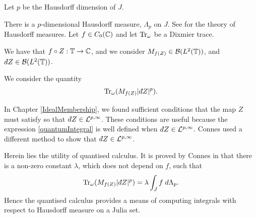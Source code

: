 Let $p$ be the Hausdorff dimension of $J$.

There is a $p$-dimensional Hausdorff measure, $\Lambda_p$ on $J$. See \cite{rogers1998hausdorff} for the theory
of Hausdorff measures.
Let
$f\in C_0(\mathbb{C})$ and let $\operatorname{Tr}_\omega$
be a Dixmier trace. 

We have that $f\circ Z :\mathbb{T}\to \mathbb{C}$, and we consider $M_{f(Z)} \in \mathcal{B}(L^2(\mathbb{T}))$,
and $\qd Z \in \mathcal{B}(L^2(\Circ))$.

We consider the quantity
\begin{equation}
    \label{quantumIntegral}
    \Tr_\omega(M_{f(Z)}|\qd Z|^p).
\end{equation}

\begin{remark}
    In Chapter \ref{IdealMembership}, we found sufficient conditions that the map
    $Z$ must satisfy so that $\qd Z \in \mathcal{L}^{p,\infty}$. These conditions
    are useful because the expression \ref{quantumIntegral} is well defined
    when $\qd Z \in \mathcal{L}^{p,\infty}$. Connes \cite[Ch. 4, Prop. 7]{Connes94} used
    a different method to show that $\qd Z \in \mathcal{L}^{p,\infty}$.
\end{remark}

Herein lies the utility
of quantised calculus.
It is proved by Connes in \cite[Ch. 4, Thm 17]{Connes94} that there is a non-zero constant $\lambda$,
which does not depend on $f$, such that
\begin{equation}
    \Tr_\omega(M_{f(Z)}|\qd Z|^p) = \lambda \int_J f\;d\Lambda_p.
\end{equation}
Hence the quantised calculus provides a means of computing integrals
with respect to Hausdorff measure on a Julia set.
